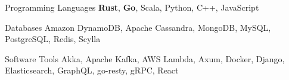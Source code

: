 

\begin{cvskills}

  \cvskill
    {Programming Languages} %
    {{\bf Rust}, {\bf Go}, Scala, Python, C++, JavaScript} %

  \cvskill
    {Databases} %
    {Amazon DynamoDB, Apache Cassandra, MongoDB, MySQL, PostgreSQL, Redis, Scylla} %

  \cvskill
    {Software Tools} %
    {Akka, Apache Kafka, AWS Lambda, Axum, Docker, Django, Elasticsearch, GraphQL, go-resty, gRPC, React} %

\end{cvskills}
